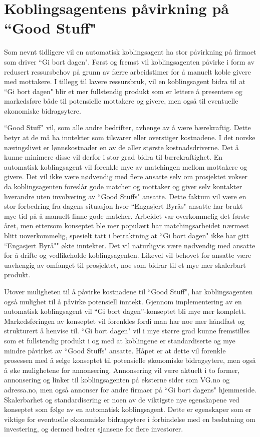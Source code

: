 \section{Koblingsagentens påvirkning på ``Good Stuff"}
Som nevnt tidligere vil en automatisk koblingsagent ha stor påvirkning på firmaet som driver ``Gi bort dagen". Først og fremst vil koblingsagenten påvirke i form av redusert ressursbehov på grunn av færre arbeidstimer for å manuelt koble givere med mottakere. I tillegg til lavere ressursbruk, vil en koblingsagent bidra til at ``Gi bort dagen" blir et mer fullstendig produkt som er lettere å presentere og markedsføre både til potensielle mottakere og givere, men også til eventuelle økonomiske bidragsytere.

``Good Stuff" vil, som alle andre bedrifter, avhenge av å være bærekraftig. Dette betyr at de må ha inntekter som tilsvarer eller overstiger kostnadene. I det norske næringslivet er lønnskostnader en av de aller største kostnadsdriverne. Det å kunne minimere disse vil derfor i stor grad bidra til bærekraftighet. En automatisk koblingsagent vil forenkle mye av matchingen mellom mottakere og givere. Det vil ikke være nødvendig med flere ansatte selv om prosjektet vokser da koblingsagenten foreslår gode matcher og mottaker og giver selv kontakter hverandre uten involvering av ``Good Stuffs" ansatte. Dette faktum vil være en stor forbedring fra dagens situasjon hvor ``Engasjert Byrås" ansatte har brukt mye tid på å manuelt finne gode matcher. Arbeidet var overkommelig det første året, men ettersom konseptet ble mer populært har matchingsarbeidet nærmest blitt uoverkommelig, spesielt tatt i betraktning at ``Gi bort dagen" ikke har gitt ``Engasjert Byrå"" økte inntekter. Det vil naturligvis være nødvendig med ansatte for å drifte og vedlikeholde koblingsagenten. Likevel vil behovet for ansatte være uavhengig av omfanget til prosjektet, noe som bidrar til et mye mer skalerbart produkt.

Utover muligheten til å påvirke kostnadene til ``Good Stuff", har koblingsagenten også mulighet til å påvirke potensiell inntekt. Gjennom implementering av en automatisk koblingsagent vil “Gi bort dagen”-konseptet bli mye mer komplett. Markedsføringen av konseptet vil forenkles fordi man har noe mer håndfast og strukturert å henvise til. ``Gi bort dagen" vil i mye større grad kunne fremstilles som et fullstendig produkt i og med at koblingene er standardiserte og mye mindre påvirket av ``Good Stuffs" ansatte. Håpet er at dette vil forenkle prosessen med å selge konseptet til potensielle økonomiske bidragsytere, men også å øke mulighetene for annonsering. Annonsering vil være aktuelt i to former, annonsering og linker til koblingsagenten på eksterne sider som VG.no og adressa.no, men også annonser for andre firmaer på ``Gi bort dagens" hjemmeside. Skalerbarhet og standardisering er noen av de viktigste nye egenskapene ved konseptet som følge av en automatisk koblingsagent. Dette er egenskaper som er viktige for eventuelle økonomiske bidragsytere i forbindelse med en beslutning om investering, og dermed bedrer sjansene for flere investorer.


